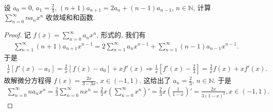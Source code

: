 \documentclass[../../main.tex]{subfiles}%
\begin{document}
\begin{example}
设 $a_0 = 0$, $a_1 = \frac{2}{3}$, $(n + 1)a_{n+1} = 2a_n + (n - 1)a_{n-1}$, $n \in \mathbb{N}$, 计算 $\sum_{n=0}^{\infty} n a_n x^n$ 收敛域和和函数.
\end{example}
\begin{proof}
记 $f(x) = \sum_{n=0}^{\infty} a_n x^n$, 形式的, 我们有
\begin{align*}
\sum_{n=1}^{\infty} (n + 1) a_{n+1} x^{n - 1} = 2 \sum_{n=1}^{\infty} a_n x^{n - 1} + \sum_{n=1}^{\infty} (n - 1) a_{n-1} x^{n - 1}.
\end{align*}
于是
\begin{align*}
\frac{1}{x} [f'(x) - a_1] = \frac{2}{x} [f(x) - a_0] + x f'(x) \Rightarrow \frac{1}{x} \left[ f'(x) - \frac{2}{3} \right] = \frac{2}{x} f(x) + x f'(x).
\end{align*}
故解微分方程得 $f(x) = \frac{2x}{3 - 3x}$, $x \in (-1,1)$. 这给出了 $a_n = \frac{2}{3}$, $n \in \mathbb{N}$. 于是
\begin{align*}
\sum_{n=0}^{\infty} n a_n x^n = \frac{2}{3} \sum_{n=0}^{\infty} n x^n = \frac{2}{3} x \left( \sum_{n=0}^{\infty} x^n \right)' = \frac{2}{3} x \left( \frac{1}{1 - x} \right)' = \frac{2x}{3(1 - x)^2}, x \in (-1,1).
\end{align*}
\end{proof}
\end{document}
